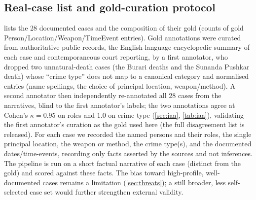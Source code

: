 \documentclass[conference]{IEEEtran}
\begin{document}
\subsection{Real-case list and gold-curation protocol}
\label{app:cases}
 lists the 28 documented cases and the composition of their gold
(counts of gold Person/Location/Weapon/TimeEvent entries). Gold annotations were
curated from authoritative public records, the English-language encyclopedic
summary of each case and contemporaneous court reporting, by a first annotator,
who dropped two unnatural-death cases (the Burari deaths and the Sunanda Pushkar
death) whose ``crime type'' does not map to a canonical category and normalised
entries (name spellings, the choice of principal location, weapon/method). A
second annotator then independently re-annotated all 28 cases from the narratives,
blind to the first annotator's labels; the two annotations agree at Cohen's
$\kappa=0.95$ on roles and $1.0$ on crime type (\cref{sec:iaa}, \cref{tab:iaa}),
validating the first annotator's curation as the gold used here (the full
disagreement list is released).
For each case we recorded the named persons and their roles, the single principal
location, the weapon or method, the crime type(s), and the documented
dates/time-events, recording only facts asserted by the sources and not
inferences. The pipeline is run on a short factual narrative of each case
(distinct from the gold) and scored against these facts. The bias toward
high-profile, well-documented cases remains a limitation (\cref{sec:threats}); a
still broader, less self-selected case set would further strengthen external
validity.
\end{document}

